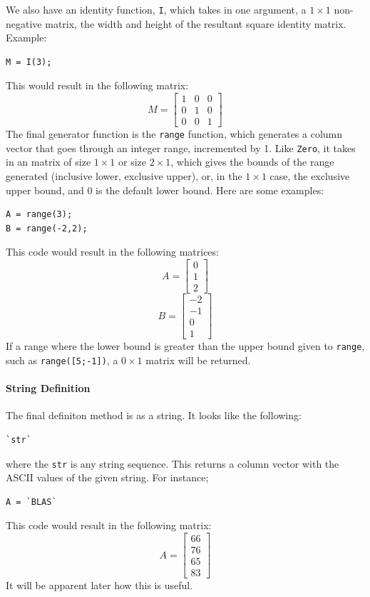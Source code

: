 We also have an identity function, \verb=I=, which takes in one argument, a $1\times 1$ non-negative matrix, the width and height of the resultant square identity matrix.  Example:\begin{lstlisting}
M = I(3);
\end{lstlisting}
This would result in the following matrix:
$$M=\begin{bmatrix}1&0&0\\0&1&0\\0&0&1\end{bmatrix}$$
The final generator function is the \verb=range= function, which generates a column vector that goes through an integer range, incremented by 1.  Like \verb=Zero=, it takes in an matrix of size $1\times 1$ or size $2\times 1$, which gives the bounds of the range generated (inclusive lower, exclusive upper), or, in the $1\times 1$ case, the exclusive upper bound, and 0 is the default lower bound.  Here are some examples:
\begin{lstlisting}
A = range(3);
B = range(-2,2);
\end{lstlisting}
This code would result in the following matrices:
$$A = \begin{bmatrix}0 \\ 1 \\ 2 \end{bmatrix}$$
$$B = \begin{bmatrix}-2 \\ -1 \\ 0 \\ 1 \end{bmatrix}$$
If a range where the lower bound is greater than the upper bound given to \verb=range=, such as \verb=range([5;-1])=, a $0 \times 1$ matrix will be returned.

\paragraph{String Definition}
The final definiton method is as a string.  It looks like the following:
\begin{lstlisting}
`str`
\end{lstlisting}
where the \verb=str= is any string sequence.  This returns a column vector with the ASCII values of the given string.  For instance;
\begin{lstlisting}
A = `BLAS`
\end{lstlisting}
This code would result in the following matrix:
$$A = \begin{bmatrix}66 \\ 76 \\ 65 \\ 83\end{bmatrix}$$
It will be apparent later how this is useful.

